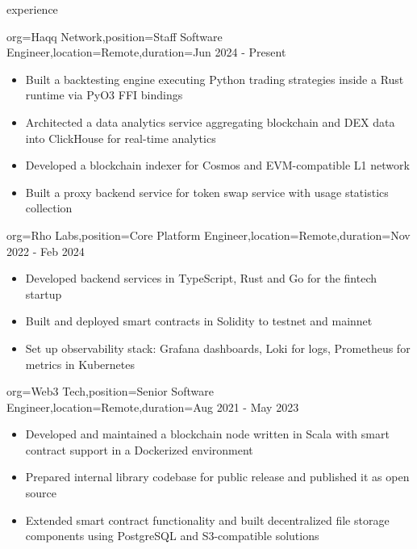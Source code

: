 \documentclass{resume}
\begin{document}
\begin{ResumeSection}{experience}
\begin{ResumeSubsection}{org=Haqq Network,position=Staff Software Engineer,location=Remote,duration=Jun 2024 - Present}
\begin{itemize}
    \item Built a backtesting engine executing Python trading strategies inside a Rust runtime via PyO3 FFI bindings
    \item Architected a data analytics service aggregating blockchain and DEX data into ClickHouse for real-time analytics
    \item Developed a blockchain indexer for Cosmos and EVM-compatible L1 network
    \item Built a proxy backend service for token swap service with usage statistics collection
\end{itemize}
    \end{ResumeSubsection}

    \begin{ResumeSubsection}{org=Rho Labs,position=Core Platform Engineer,location=Remote,duration=Nov 2022 - Feb 2024}
\begin{itemize}
    \item Developed backend services in TypeScript, Rust and Go for the fintech startup
    \item Built and deployed smart contracts in Solidity to testnet and mainnet
    \item Set up observability stack: Grafana dashboards, Loki for logs, Prometheus for metrics in Kubernetes
\end{itemize}
\end{ResumeSubsection}

    \begin{ResumeSubsection}{org=Web3 Tech,position=Senior Software Engineer,location=Remote,duration=Aug 2021 - May 2023}
\begin{itemize}
    \item Developed and maintained a blockchain node written in Scala with smart contract support in a Dockerized environment
    \item Prepared internal library codebase for public release and published it as open source
    \item Extended smart contract functionality and built decentralized file storage components using PostgreSQL and S3-compatible solutions
\end{itemize}
\end{ResumeSubsection}


\end{ResumeSection}
\end{document}
